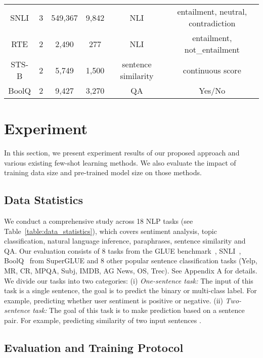 \documentclass{article}
\begin{document}
\begin{table*}[t]
{\begin{tabular}{cccccc}
SNLI & 3 & 549,367 & 9,842 & NLI &  entailment, neutral, contradiction \\
RTE & 2 & 2,490 & 277 & NLI & entailment, not\_entailment \\
STS-B & 2 & 5,749 & 1,500 & sentence similarity &  continuous score \\
BoolQ & 2 & 9,427 & 3,270 & QA & Yes/No \\
\bottomrule
\end{tabular}}
\caption{The datasets evaluated in this work. :  of classes for classification tasks. Note that we only sample  with  examples from the original training set and evaluate using full dev dataset in our few-shot experiments }
\label{table:data_statistics}
\end{table*}
\section{Experiment}

In this section, we present experiment results of our proposed approach and various existing few-shot learning methods. We also evaluate the impact of training data size and pre-trained model size on those methods.

\subsection{Data Statistics}

We conduct a comprehensive study across 18 NLP tasks (see
Table~\ref{table:data_statistics}), which covers sentiment analysis, topic classification, natural language inference, paraphrases, sentence similarity and QA. Our evaluation consists of 8 tasks from the GLUE benchmark~\citep{wang2018glue}, SNLI~\citep{bowman2015large}, BoolQ~\citep{clark2019boolq} from SuperGLUE and 8 other popular sentence classification tasks (Yelp, MR, CR, MPQA, Subj, IMDB, AG News, OS, Trec). See Appendix A for details. We divide our tasks into two categories: (i) \emph{One-sentence task:} The input of this task is a single sentence, the goal is to predict the binary or multi-class label. For example, predicting whether user sentiment is positive or negative. 
(ii) \emph{Two-sentence task:} The goal of this task is to make prediction based on a sentence pair. For example, predicting similarity of two input sentences . 


\subsection{Evaluation and Training Protocol}
\end{document}
